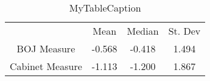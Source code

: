 \documentclass[10pt]{article}
\begin{document}
\begin{table}
\centering
\begin{tabular}{cccc}
 & Mean & Median & St. Dev \\
BOJ Measure & -0.568 & -0.418 & 1.494 \\
Cabinet Measure & -1.113 & -1.200 & 1.867 \\
\end{tabular}
\caption{MyTableCaption}
\label{table:MyTableLabel}
\end{table}
\end{document}
